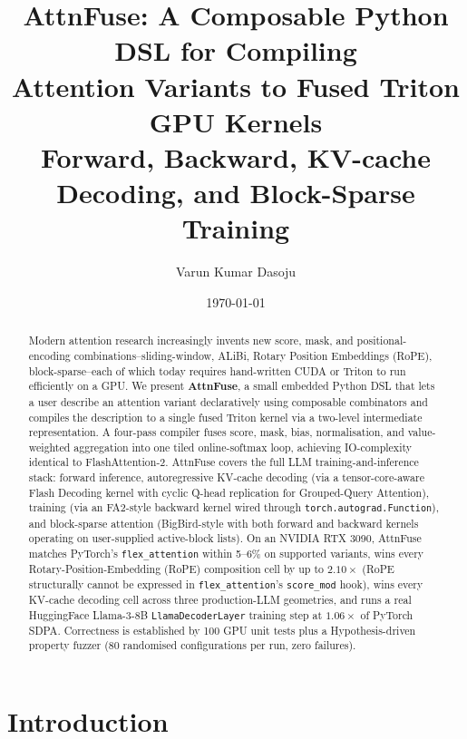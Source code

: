 \documentclass[10pt,twocolumn]{article}
\title{%
  \textbf{AttnFuse: A Composable Python DSL for Compiling\\
  Attention Variants to Fused Triton GPU Kernels}\\[6pt]
  \large Forward, Backward, KV-cache Decoding, and Block-Sparse Training
}
\author{Varun Kumar Dasoju}
\date{\today}
\begin{document}
\maketitle

\begin{abstract}
Modern attention research increasingly invents new score, mask, and
positional-encoding combinations--sliding-window, ALiBi, Rotary Position
Embeddings (RoPE), block-sparse--each of which today requires hand-written
CUDA or Triton to run efficiently on a GPU. We present \textbf{AttnFuse},
a small embedded Python DSL that lets a user describe an attention variant
declaratively using composable combinators and compiles the description to
a single fused Triton kernel via a two-level intermediate representation.
A four-pass compiler fuses score, mask, bias, normalisation, and
value-weighted aggregation into one tiled online-softmax loop, achieving
IO-complexity identical to FlashAttention-2. AttnFuse covers the full LLM
training-and-inference stack: forward inference, autoregressive KV-cache
decoding (via a tensor-core-aware Flash Decoding kernel with cyclic
Q-head replication for Grouped-Query Attention), training (via an
FA2-style backward kernel wired through \texttt{torch.autograd.Function}),
and block-sparse attention (BigBird-style with both forward and backward
kernels operating on user-supplied active-block lists). On an NVIDIA RTX
3090, AttnFuse matches PyTorch's \texttt{flex\_attention} within 5--6\%
on supported variants, wins every Rotary-Position-Embedding (RoPE)
composition cell by up to $2.10\times$ (RoPE structurally cannot be
expressed in \texttt{flex\_attention}'s \texttt{score\_mod} hook), wins
every KV-cache decoding cell across three production-LLM geometries, and
runs a real HuggingFace Llama-3-8B \texttt{LlamaDecoderLayer} training
step at $1.06\times$ of PyTorch SDPA. Correctness is established by 100
GPU unit tests plus a Hypothesis-driven property fuzzer (80 randomised
configurations per run, zero failures).
\end{abstract}

\section{Introduction}
\end{document}
